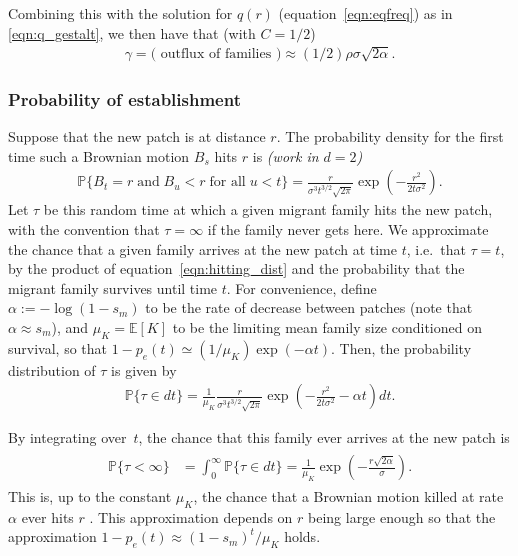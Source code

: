 \documentclass{article}
\renewcommand{\P}{\mathbb{P}}
\newcommand{\E}{\mathbb{E}}
\newcommand{\deq}{\stackrel{\scriptscriptstyle{d}}{=}}
\newcommand{\plr}[1]{{\it\color{blue}(#1)}}
\begin{document}
Combining this with the solution for $q(r)$ (equation~\eqref{eqn:eqfreq}) as in \eqref{eqn:q_gestalt},
we then have that (with $C=1/2$)
\begin{align} \label{eqn:outflux}
    \gamma = \text{( outflux of families )} \approx (1/2) \rho \sigma \sqrt{2\alpha} .
\end{align}

\subsubsection*{Probability of establishment}

Suppose that the new patch is at distance $r$.
The probability density for the first time such a Brownian motion $B_s$ hits $r$ is
\citep[XXX]{feller}
\plr{work in $d=2$}
\begin{align} \label{eqn:hitting_dist}
  \P\{ B_t=r \;\mbox{and} \; B_u<r \;\mbox{for all}\; u<t\} =  \frac{r}{\sigma^3 t^{3/2}\sqrt{2\pi}} \exp\left(-\frac{r^2}{2t\sigma^2}\right) .
\end{align}
Let $\tau$ be this random time at which a given migrant family hits the new patch,
with the convention that $\tau =\infty$ if the family never gets here.
We approximate the chance that a given family arrives at the new patch at time $t$, i.e.\ that $\tau=t$,
by the product of equation~\eqref{eqn:hitting_dist} and the probability that the migrant family survives until time $t$.
For convenience, define $\alpha := - \log(1-s_m)$ to be the rate of decrease between patches (note that $\alpha \approx s_m$),
and $\mu_K = \E[K]$ to be the limiting mean family size conditioned on survival,
so that $1-p_e(t) \simeq (1/\mu_K) \exp(-\alpha t)$.
Then, the probability distribution of $\tau$ is given by
\begin{align}
    \P\{ \tau \in dt \} =  \frac{1}{\mu_K} \frac{r}{\sigma^3 t^{3/2}\sqrt{2\pi}} \exp\left(-\frac{r^2}{2t\sigma^2} - \alpha t \right) dt  .
\end{align}

By integrating over~$t$, the chance that this family ever arrives at the new patch is
\begin{align} 
\label{eqn:estab_prob}
  \begin{split}
      \P\{ \tau < \infty \} &= \int_0^\infty \P\{ \tau \in dt \} = \frac{1}{\mu_K} \exp\left( - \frac{ r \sqrt{2 \alpha}}{\sigma} \right) .
  \end{split}
\end{align}
This is, up to the constant $\mu_K$, the chance that a Brownian motion killed at rate $\alpha$
ever hits $r$ \citep{feller}.
This approximation depends on $r$ being large enough so that the approximation $1-p_e(t) \approx (1-s_m)^t/\mu_K$ holds.
\end{document}

